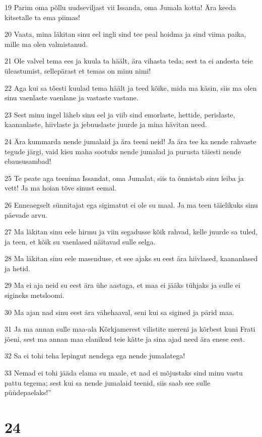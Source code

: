 \par 19 Parim oma põllu uudseviljast vii Issanda, oma Jumala kotta! Ära keeda kitsetalle ta ema piimas!
\par 20 Vaata, mina läkitan sinu eel ingli sind tee peal hoidma ja sind viima paika, mille ma olen valmistanud.
\par 21 Ole valvel tema ees ja kuula ta häält, ära vihasta teda; sest ta ei andesta teie üleastumist, sellepärast et temas on minu nimi!
\par 22 Aga kui sa tõesti kuulad tema häält ja teed kõike, mida ma käsin, siis ma olen sinu vaenlaste vaenlane ja vastaste vastane.
\par 23 Sest minu ingel läheb sinu eel ja viib sind emorlaste, hettide, perislaste, kaananlaste, hiivlaste ja jebuuslaste juurde ja mina hävitan need.
\par 24 Ära kummarda nende jumalaid ja ära teeni neid! Ja ära tee ka nende rahvaste tegude järgi, vaid kisu maha sootuks nende jumalad ja purusta täiesti nende ebaususambad!
\par 25 Te peate aga teenima Issandat, oma Jumalat, siis ta õnnistab sinu leiba ja vett! Ja ma hoian tõve sinust eemal.
\par 26 Enneaegselt sünnitajat ega sigimatut ei ole su maal. Ja ma teen täielikuks sinu päevade arvu.
\par 27 Ma läkitan sinu eele hirmu ja viin segadusse kõik rahvad, kelle juurde sa tuled, ja teen, et kõik su vaenlased näitavad sulle selga.
\par 28 Ma läkitan sinu eele masenduse, et see ajaks su eest ära hiivlased, kaananlased ja hetid.
\par 29 Ma ei aja neid su eest ära ühe aastaga, et maa ei jääks tühjaks ja sulle ei sigineks metsloomi.
\par 30 Ma ajan nad sinu eest ära vähehaaval, seni kui sa sigined ja pärid maa.
\par 31 Ja ma annan sulle maa-ala Kõrkjamerest vilistite mereni ja kõrbest kuni Frati jõeni, sest ma annan maa elanikud teie kätte ja sina ajad need ära enese eest.
\par 32 Sa ei tohi teha lepingut nendega ega nende jumalatega!
\par 33 Nemad ei tohi jääda elama su maale, et nad ei mõjustaks sind minu vastu pattu tegema; sest kui sa nende jumalaid teenid, siis saab see sulle püüdepaelaks!”

\chapter{24}

